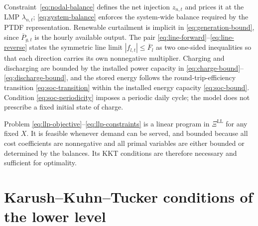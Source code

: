 \documentclass[11pt,a4paper,fleqn]{article}
\numberwithin{equation}{section}
\begin{document}
Constraint~\eqref{eq:nodal-balance} defines the net injection $z_{n,t}$ and
prices it at the LMP $\lambda_{n,t}$; \eqref{eq:system-balance} enforces the
system-wide balance required by the PTDF representation. Renewable
curtailment is implicit in \eqref{eq:generation-bound}, since $\overline
P_{g,t}$ is the hourly available output. The pair
\eqref{eq:line-forward}--\eqref{eq:line-reverse} states the symmetric line
limit $|f_{l,t}|\leq\overline F_l$ as two one-sided inequalities so that each
direction carries its own nonnegative multiplier. Charging and discharging are
bounded by the installed power capacity in
\eqref{eq:charge-bound}--\eqref{eq:discharge-bound}, and the stored energy
follows the round-trip-efficiency transition \eqref{eq:soc-transition} within
the installed energy capacity \eqref{eq:soc-bound}. Condition
\eqref{eq:soc-periodicity} imposes a periodic daily cycle; the model does not
prescribe a fixed initial state of charge.

Problem \eqref{eq:llp-objective}--\eqref{eq:llp-constraints} is a linear
program in $\Xi^{\mathrm{LL}}$ for any fixed $X$. It is feasible whenever
demand can be served, and bounded because all cost coefficients are
nonnegative and all primal variables are either bounded or determined by the
balances. Its KKT conditions are therefore necessary and sufficient for
optimality.

\section{Karush--Kuhn--Tucker conditions of the lower level}
\label{sec:kkt}
\end{document}
